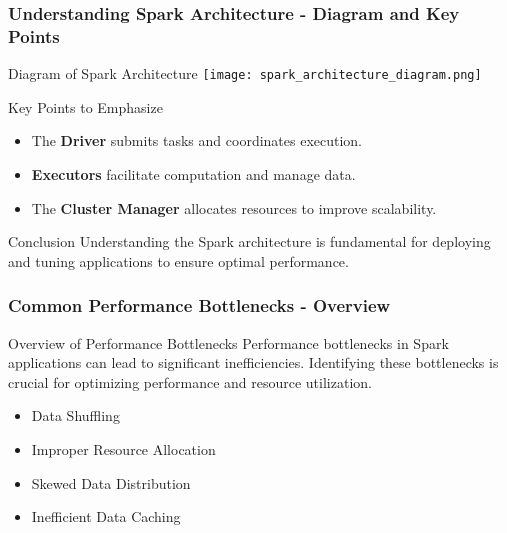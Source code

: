 \documentclass[aspectratio=169]{beamer}
\begin{document}
\begin{frame}[fragile]
    \frametitle{Understanding Spark Architecture - Diagram and Key Points}
    \begin{block}{Diagram of Spark Architecture}
        \centering
        \texttt{[image: spark\_architecture\_diagram.png]}
    \end{block}
    \begin{block}{Key Points to Emphasize}
        \begin{itemize}
            \item The \textbf{Driver} submits tasks and coordinates execution.
            \item \textbf{Executors} facilitate computation and manage data.
            \item The \textbf{Cluster Manager} allocates resources to improve scalability.
        \end{itemize}
    \end{block}
    \begin{block}{Conclusion}
        Understanding the Spark architecture is fundamental for deploying and tuning applications to ensure optimal performance.
    \end{block}
\end{frame}

\begin{frame}[fragile]
    \frametitle{Common Performance Bottlenecks - Overview}
    
    \begin{block}{Overview of Performance Bottlenecks}
        Performance bottlenecks in Spark applications can lead to significant inefficiencies. Identifying these bottlenecks is crucial for optimizing performance and resource utilization.
    \end{block}
    
    \begin{itemize}
        \item Data Shuffling
        \item Improper Resource Allocation
        \item Skewed Data Distribution
        \item Inefficient Data Caching
    \end{itemize}
\end{frame}
\end{document}
